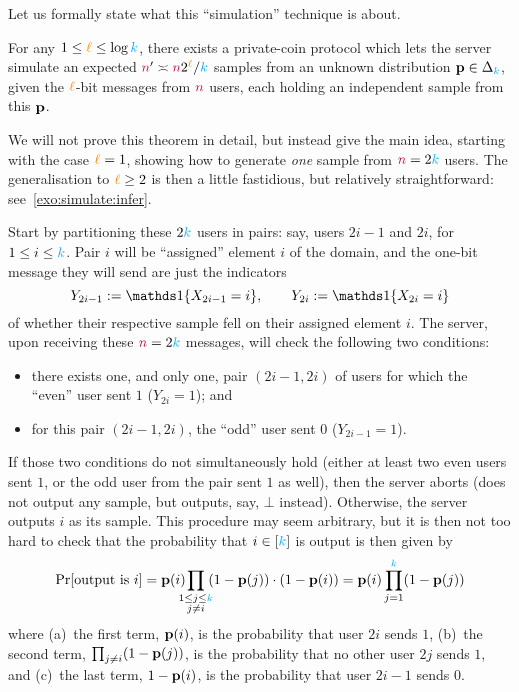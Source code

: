 \noindent Let us formally state what this ``simulation'' technique is about.
\begin{theorem}
	\label{theo:simulate:infer}
For any $1\leq {\textcolor{orange}{\ell}} \leq \log{\textcolor{cyan}{k}}$, there exists a private-coin protocol which lets the server simulate an expected ${\textcolor{purple}{n}}' \asymp {\textcolor{purple}{n}} 2^{\textcolor{orange}{\ell}}/{\textcolor{cyan}{k}}$ \iid samples from an unknown distribution $\mathbf{p}\in\Delta_{{\textcolor{cyan}{k}}}$, given the ${\textcolor{orange}{\ell}}$-bit messages from ${\textcolor{purple}{n}}$ users, each holding an independent sample from this $\mathbf{p}$.
\end{theorem}

We will not prove this theorem in detail, but instead give the main idea, starting with the case ${\textcolor{orange}{\ell}}=1$, showing how to generate \emph{one} sample from ${\textcolor{purple}{n}}=2{\textcolor{cyan}{k}}$ users. The generalisation to ${\textcolor{orange}{\ell}}\geq 2$ is then a little fastidious, but relatively straightforward: see~\cref{exo:simulate:infer}. 

Start by partitioning these $2{\textcolor{cyan}{k}}$ users in pairs: say, users $2i-1$ and $2i$, for $1\leq i\leq {\textcolor{cyan}{k}}$. Pair $i$ will be ``assigned'' element $i$ of the domain, and the one-bit message they will send are just the indicators
\[
	Y_{2i-1} \eqdef \indic{X_{2i-1}=i}, \qquad Y_{2i} \eqdef \indic{X_{2i}=i}
\]
of whether their respective sample fell on their assigned element $i$. The server, upon receiving these ${\textcolor{purple}{n}}=2{\textcolor{cyan}{k}}$ messages, will check the following two conditions:
\begin{itemize}
	\item there exists one, and only one, pair $(2i-1,2i)$ of users for which the ``even'' user sent $1$ ($Y_{2i}=1$); and
	\item for this pair $(2i-1,2i)$, the ``odd'' user sent $0$ ($Y_{2i-1}=1$).
\end{itemize}
If those two conditions do not simultaneously hold (either at least two even users sent $1$, or the odd user from the pair sent $1$ as well), then the server aborts (does not output any sample, but outputs, say, $\bot$ instead). Otherwise, the server outputs $i$ as its sample. This procedure may seem arbitrary, but it is then not too hard to check that the probability that $i\in[{\textcolor{cyan}{k}}]$ is output is then given by
\begin{equation}
	\label{eq:simulate:infer:babyversion}
	\bPr{ \text{output is } i } = \p(i)\!\!\!\!\prod_{\substack{1\leq j\leq \ab\\j\neq i}} \!\!(1-\p(j)) \cdot (1-\p(i))
	= \p(i)\prod_{j=1}^\ab (1-\p(j))
\end{equation}
where (a)~the first term, $\mathbf{p}(i)$, is the probability that user $2i$ sends $1$, (b)~the second term, $\prod_{j\neq i} (1-\mathbf{p}(j))$, is the probability that no other user $2j$ sends $1$, and (c)~the last term, $1-\mathbf{p}(i)$, is the probability that user $2i-1$ sends $0$.

